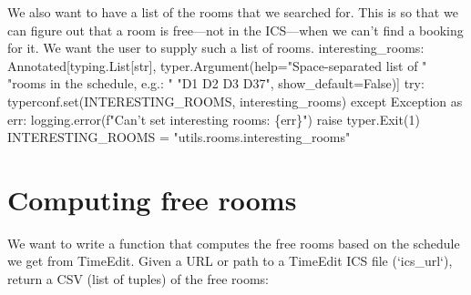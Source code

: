 We also want to have a list of the rooms that we searched for.
This is so that we can figure out that a room is free---\ie not in the 
ICS---when we can't find a booking for it.
We want the user to supply such a list of rooms.
\nwenddocs{}\plusendmoddef\nwstartdeflinemarkup{}\nwenddeflinemarkup
interesting_rooms: Annotated[typing.List[str],
                             typer.Argument(help="Space-separated list of "
                                                 "rooms in the schedule, e.g.: "
                                                 "D1 D2 D3 D37",
                                            show_default=False)]
\nwendcode{}\plusendmoddef\nwstartdeflinemarkup{}\nwenddeflinemarkup
try:
  typerconf.set(INTERESTING_ROOMS, interesting_rooms)
except Exception as err:
  logging.error(f"Can't set interesting rooms: \{err\}")
  raise typer.Exit(1)
\nwendcode{}\plusendmoddef\nwstartdeflinemarkup{}\nwenddeflinemarkup
INTERESTING_ROOMS = "utils.rooms.interesting_rooms"
\nwendcode{}\nwdocspar


\section{Computing free rooms}

We want to write a function that computes the free rooms based on the schedule 
we get from TimeEdit.
\nwenddocs{}\endmoddef\nwstartdeflinemarkup{}\nwenddeflinemarkup
Given a URL or path to a TimeEdit ICS file (`ics_url`),
return a CSV (list of tuples) of the free rooms:

